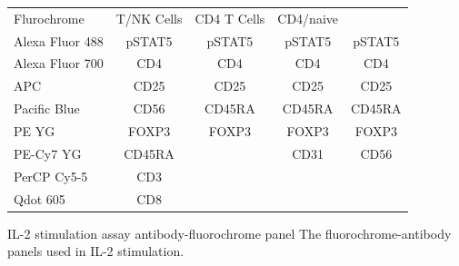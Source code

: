 

\begin{table}[h!]\footnotesize
  \centering
\begin{tabularx}{\textwidth}{lcccc}
\rowcolor{Gray}
Flurochrome     & T/NK Cells & CD4 T Cells & CD4/naive  &  \\
Alexa Fluor 488 & pSTAT5 & pSTAT5 & pSTAT5 & pSTAT5 & \\
Alexa Fluor 700 & CD4    & CD4    & CD4    & CD4    & \\
APC             & CD25   & CD25   & CD25   & CD25   & \\
Pacific Blue    & CD56   & CD45RA & CD45RA & CD45RA & \\
PE YG           & FOXP3  & FOXP3  & FOXP3  & FOXP3  & \\
PE-Cy7 YG       & CD45RA &        & CD31   & CD56   & \\
PerCP Cy5-5     & CD3    &        &        &        & \\
Qdot 605        & CD8    &        &        &        & \\
\end{tabularx}
{IL-2 stimulation assay antibody-fluorochrome panel}
{
The fluorochrome-antibody panels used in IL-2 stimulation.
}
\end{table}



